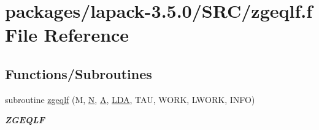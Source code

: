 \hypertarget{zgeqlf_8f}{}\section{packages/lapack-\/3.5.0/\+S\+R\+C/zgeqlf.f File Reference}
\label{zgeqlf_8f}
\subsection*{Functions/\+Subroutines}
\begin{DoxyCompactItemize}
\item 
subroutine \hyperlink{group__complex16GEcomputational_ga2c9504804543ffed09279bde84754e62}{zgeqlf} (M, \hyperlink{polmisc_8c_a0240ac851181b84ac374872dc5434ee4}{N}, \hyperlink{classA}{A}, \hyperlink{example__user_8c_ae946da542ce0db94dced19b2ecefd1aa}{L\+D\+A}, T\+A\+U, W\+O\+R\+K, L\+W\+O\+R\+K, I\+N\+F\+O)
\begin{DoxyCompactList}\small\item\em {\bfseries Z\+G\+E\+Q\+L\+F} \end{DoxyCompactList}\end{DoxyCompactItemize}
